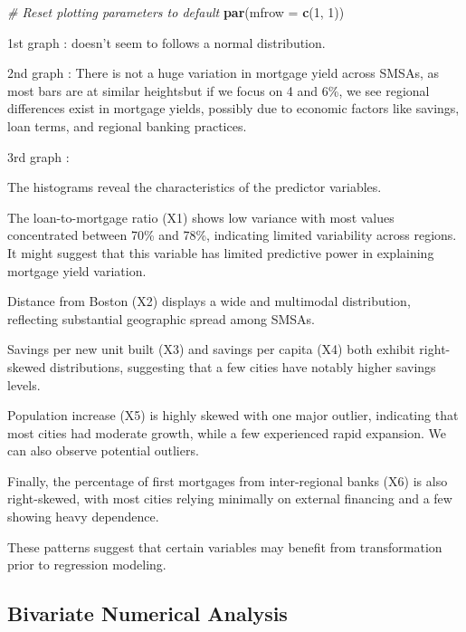 \documentclass[
  12pt,
]{article}
\newenvironment{Shaded}{\begin{snugshade}}{\end{snugshade}}
\newcommand{\AttributeTok}[1]{\textcolor[rgb]{0.13,0.29,0.53}{#1}}
\newcommand{\CommentTok}[1]{\textcolor[rgb]{0.56,0.35,0.01}{\textit{#1}}}
\newcommand{\DecValTok}[1]{\textcolor[rgb]{0.00,0.00,0.81}{#1}}
\newcommand{\FunctionTok}[1]{\textcolor[rgb]{0.13,0.29,0.53}{\textbf{#1}}}
\newcommand{\NormalTok}[1]{#1}
\begin{document}
\begin{Shaded}
\begin{Highlighting}[]
\CommentTok{\# Reset plotting parameters to default}
\FunctionTok{par}\NormalTok{(}\AttributeTok{mfrow =} \FunctionTok{c}\NormalTok{(}\DecValTok{1}\NormalTok{, }\DecValTok{1}\NormalTok{))}
\end{Highlighting}
\end{Shaded}

1st graph : doesn't seem to follows a normal distribution.

2nd graph : There is not a huge variation in mortgage yield across
SMSAs, as most bars are at similar heightsbut if we focus on 4 and 6\%,
we see regional differences exist in mortgage yields, possibly due to
economic factors like savings, loan terms, and regional banking
practices.

3rd graph :

The histograms reveal the characteristics of the predictor variables.

The loan-to-mortgage ratio (X1) shows low variance with most values
concentrated between 70\% and 78\%, indicating limited variability
across regions. It might suggest that this variable has limited
predictive power in explaining mortgage yield variation.

Distance from Boston (X2) displays a wide and multimodal distribution,
reflecting substantial geographic spread among SMSAs.

Savings per new unit built (X3) and savings per capita (X4) both exhibit
right-skewed distributions, suggesting that a few cities have notably
higher savings levels.

Population increase (X5) is highly skewed with one major outlier,
indicating that most cities had moderate growth, while a few experienced
rapid expansion. We can also observe potential outliers.

Finally, the percentage of first mortgages from inter-regional banks
(X6) is also right-skewed, with most cities relying minimally on
external financing and a few showing heavy dependence.

These patterns suggest that certain variables may benefit from
transformation prior to regression modeling.

\subsection{Bivariate Numerical
Analysis}\label{bivariate-numerical-analysis}
\end{document}

